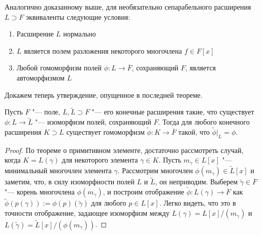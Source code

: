 \begin{note}
	Аналогично доказанному выше, для необязательно сепарабельного расширения $L \supset F$ эквиваленты следующие условия:
	\begin{enumerate}
		\item Расширение $L$ нормально
		\item $L$ является полем разложения некоторого многочлена $f \in F[x]$
		\item Любой гомоморфизм полей $\phi: L \to \overline{F}$, сохраняющий $F$, является автоморфизмом $L$
	\end{enumerate}
\end{note}

Докажем теперь утверждение, опущенное в последней теореме.

\begin{proposition}
	Пусть $F$ "--- поле, $L, \widetilde{L} \supset F$ "--- его конечные расширения такие, что существует $\phi: L \to \widetilde{L}$ "--- изоморфизм полей, сохраняющий $F$. Тогда для любого конечного расширения $K \supset L$ существует гомоморфизм $\widetilde{\phi}: K \to \overline{F}$ такой, что $\widetilde\phi|_{L} = \phi$.
\end{proposition}

\begin{proof}
	По теореме о примитивном элементе, достаточно рассмотреть случай, когда $K = L(\gamma)$ для некоторого элемента $\gamma \in K$. Пусть $m_\gamma \in L[x]$ "--- минимальный многочлен элемента $\gamma$. Рассмотрим многочлен $\phi(m_\gamma) \in \widetilde{L}[x]$ и заметим, что, в силу изоморфности полей $L$ и $\widetilde{L}$, он неприводим. Выберем $\widetilde{\gamma} \in \overline{F}$ "--- корень многочлена $\phi(m_\gamma)$, и построим отображение $\widetilde{\phi}: L(\gamma) \to \overline{F}$ как $\widetilde{\phi}(p(\gamma)) := \phi(p)(\widetilde{\gamma})$ для любого $p \in L[x]$. Легко видеть, что это в точности отображение, задающее изоморфизм между $L(\gamma) = L[x] / (m_\gamma)$ и $L(\widetilde{\gamma}) = \widetilde{L}[x] / (\phi(m_\gamma))$.
\end{proof}

